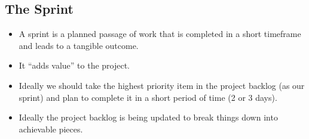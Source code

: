 \documentclass[a4paper,12pt]{article}
\begin{document}
\subsection{The Sprint}
\begin{itemize}
	\item A sprint is a planned passage of work that is completed in a short timeframe and leads to a tangible outcome.
	\item It ``adds value'' to the project.
	\item Ideally we should take the highest priority item in the project backlog (as our sprint) and plan to complete it in a short period of time (2 or 3 days).
	\item Ideally the project backlog is being updated to break things down into achievable pieces.
\end{itemize}
\end{document}
